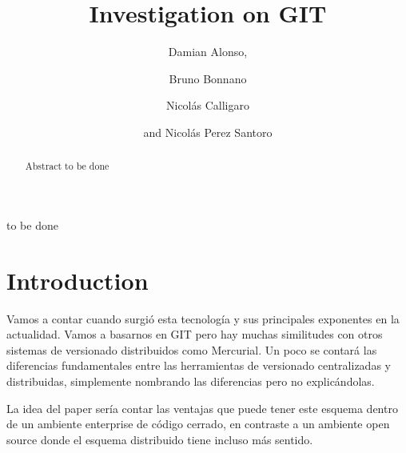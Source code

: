 \documentclass[%
	final,
	notitlepage,
	narroweqnarray,
	inline,
	twoside,
	]{ieee}
\begin{document}
\title[Investigation on GIT]{%
       Investigation on GIT}

\author[GRUPOAPIT]{Damian Alonso,%
\and{} Bruno Bonnano
\and{} Nicol\'{a}s Calligaro
\and{}and Nicol\'{a}s Perez Santoro
}



\maketitle               

\begin{abstract} 
Abstract to be done
\end{abstract}

\begin{keywords}
to be done
\end{keywords}

\section{Introduction}

\PARstart Vamos a contar cuando surgió esta tecnología y sus principales 
exponentes en la actualidad. Vamos a basarnos en GIT pero hay muchas 
similitudes con otros sistemas de versionado distribuidos como Mercurial. 
Un poco se contará las diferencias fundamentales entre las herramientas de 
versionado centralizadas y distribuidas, simplemente nombrando las diferencias 
pero no explicándolas. 

La idea del paper sería contar las ventajas que puede 
tener este esquema dentro de un ambiente enterprise de código cerrado, en contraste 
a un ambiente open source donde el esquema distribuido tiene incluso más sentido.
\end{document}
